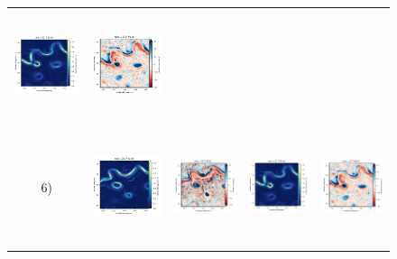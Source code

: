 \begin{figure}[h!]
\begin{center}
\begin{tabular}{ccccc}
\includegraphics[trim={13mm 13mm 22mm 5mm},clip, width=3.2cm,height=3.2cm]{figures/plots/enatl60-t_rec_ke.png} &
\includegraphics[trim={13mm 13mm 22mm 5mm},clip,width=3.2cm,height=3.2cm]{figures/plots/enatl60-t_rec_vort_r.png} \\
\hspace{-10mm} 6) &
 \includegraphics[trim={0 0 19mm 5mm},clip, width=3.60cm,height=3.4cm]{figures/plots/enatl60-0_train_ke.png} &
 \includegraphics[trim={13mm 0 22mm 5mm},clip, width=3.2cm,height=3.4cm]{figures/plots/enatl60-0_train_vort_r.png} &
 \includegraphics[trim={13mm 0 22mm 5mm},clip, width=3.2cm,height=3.4cm]{figures/plots/enatl60-0_rec_ke.png} &
 \includegraphics[trim={13mm 0 22mm 5mm},clip,width=3.2cm,height=3.4cm]{figures/plots/enatl60-0_rec_vort_r.png} \\

\end{tabular}
\end{center}
\end{figure}
